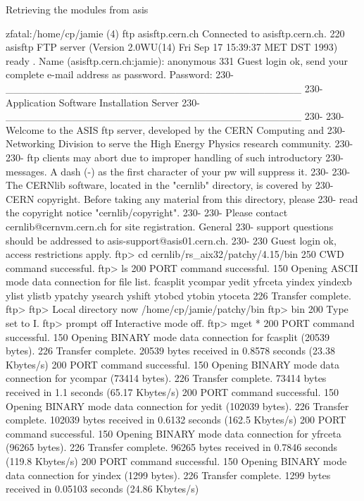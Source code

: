 \begin{XMPt}{Retrieving the modules from asis}

zfatal:/home/cp/jamie (4) ftp asisftp.cern.ch
Connected to asisftp.cern.ch.
220 asisftp FTP server (Version 2.0WU(14) Fri Sep 17 15:39:37 MET DST 1993) ready
.
Name (asisftp.cern.ch:jamie): anonymous
331 Guest login ok, send your complete e-mail address as password.
Password:
230-                   ________________________________________
230-                   Application Software Installation Server
230-                   ________________________________________
230-
230-   Welcome to the ASIS ftp server, developed by the CERN Computing and
230-   Networking Division to serve the High Energy Physics research community.
230-
230-   ftp clients may abort due to improper handling of such introductory
230-   messages. A dash (-) as the first character of your pw will suppress it.
230-
230-   The CERNlib software, located in the "cernlib" directory, is covered by
230-   CERN copyright. Before taking any material from this directory, please
230-   read the copyright notice "cernlib/copyright".
230-
230-   Please contact cernlib@cernvm.cern.ch for site registration. General
230-   support questions should be addressed to asis-support@asis01.cern.ch. 
230-
230 Guest login ok, access restrictions apply.
ftp> cd cernlib/rs_aix32/patchy/4.15/bin
250 CWD command successful.
ftp> ls
200 PORT command successful.
150 Opening ASCII mode data connection for file list.
fcasplit
ycompar
yedit
yfrceta
yindex
yindexb
ylist
ylistb
ypatchy
ysearch
yshift
ytobcd
ytobin
ytoceta
226 Transfer complete.
ftp> 
ftp> 
Local directory now /home/cp/jamie/patchy/bin
ftp> bin
200 Type set to I.
ftp> prompt off
Interactive mode off.
ftp> mget *
200 PORT command successful.
150 Opening BINARY mode data connection for fcasplit (20539 bytes).
226 Transfer complete.
20539 bytes received in 0.8578 seconds (23.38 Kbytes/s)
200 PORT command successful.
150 Opening BINARY mode data connection for ycompar (73414 bytes).
226 Transfer complete.
73414 bytes received in 1.1 seconds (65.17 Kbytes/s)
200 PORT command successful.
150 Opening BINARY mode data connection for yedit (102039 bytes).
226 Transfer complete.
102039 bytes received in 0.6132 seconds (162.5 Kbytes/s)
200 PORT command successful.
150 Opening BINARY mode data connection for yfrceta (96265 bytes).
226 Transfer complete.
96265 bytes received in 0.7846 seconds (119.8 Kbytes/s)
200 PORT command successful.
150 Opening BINARY mode data connection for yindex (1299 bytes).
226 Transfer complete.
1299 bytes received in 0.05103 seconds (24.86 Kbytes/s)

\end{XMPt}
